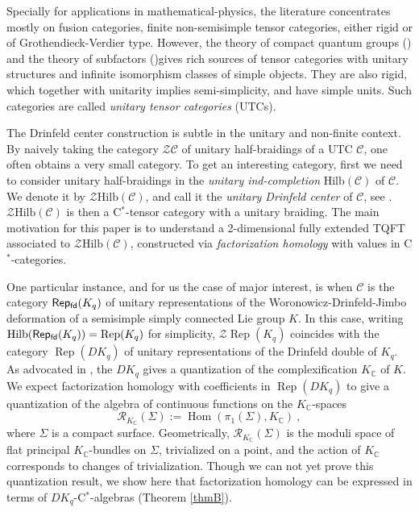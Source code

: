 \documentclass[a4paper,11pt,reqno]{amsart}
\numberwithin{equation}{section}
\theoremstyle{remark}
\theoremstyle{definition}
\newcommand{\C}{\mathbb C}
\newcommand{\cC}{\mathcal C}
\newcommand{\cR}{\mathcal R}
\newcommand{\cZ}{\mathcal Z}
\newcommand{\fdRep}{{\sf Rep_{fd}}}
\DeclareMathOperator{\Hom}{Hom}
\DeclareMathOperator{\Rep}{Rep}
\newcommand{\Hilb}{\mathrm{Hilb}}
\begin{document}
Specially for applications in mathematical-physics, the literature concentrates mostly on fusion categories, finite non-semisimple tensor categories, either rigid or of Grothendieck-Verdier type.  However, the theory of compact quantum groups (\cite{MR3204665}) and the theory of subfactors (\cite{MR0696688,MR1622812,MR3948170,Hataishi_Palomares_2025})gives rich sources of tensor categories with unitary structures and infinite isomorphism classes of simple objects. They are also rigid, which together with unitarity implies semi-simplicity, and have simple units. Such categories are called {\em unitary tensor categories} (UTCs). 



The Drinfeld center construction is subtle in the unitary and non-finite context. By naively taking the category $\cZ \cC$ of unitary half-braidings of a UTC $\cC$, one often obtains a very small category. To get an interesting category, first we need to consider unitary half-braidings in the  {\em unitary ind-completion} $\Hilb(\cC)$ of $\cC$. We denote it by $\cZ \Hilb(\cC)$, and call it the {\em unitary Drinfeld center} of $\cC$, see \cite{MR3509018}. $\cZ \Hilb(\cC)$ is then a C$^*$-tensor category with a unitary braiding. The main motivation for this paper is to understand a 2-dimensional fully extended TQFT associated to $\cZ \Hilb(\cC)$, constructed via {\em factorization homology} with values in C$^*$-categories. 

One particular instance, and for us the case of major interest, is when $\cC$ is the category $\fdRep(K_q)$ of unitary representations of the Woronowicz-Drinfeld-Jimbo deformation of a semisimple simply connected Lie group $K$. In this case, writing $\Hilb(\fdRep(K_q)) = \Rep(K_q)$ for simplicity, $\cZ \Rep(K_q)$ coincides with the category $\Rep(DK_q)$ of unitary representations of the Drinfeld double of $K_q$. As advocated in \cite{MR4162277}, the $DK_q$ gives a quantization of the complexification $K_\C$ of $K$. We expect factorization homology with coefficients in $\Rep(DK_q)$ to give a quantization of the algebra of continuous functions on the $K_\C$-spaces
\[
\cR_{K_\C}(\Sigma) := \Hom(\pi_1(\Sigma), K_\C) \ , 
\]
where $\Sigma$ is a compact surface. Geometrically, $\cR_{K_\C}(\Sigma)$ is the moduli space of flat principal $K_\C$-bundles on $\Sigma$, trivialized on a point, and the action of $K_\C$ corresponds to changes of trivialization. Though we can not yet prove this quantization result, we show here that factorization homology can be expressed in terms of $DK_q$-C$^*$-algebras (Theorem \ref{thmB}). 
\end{document}
